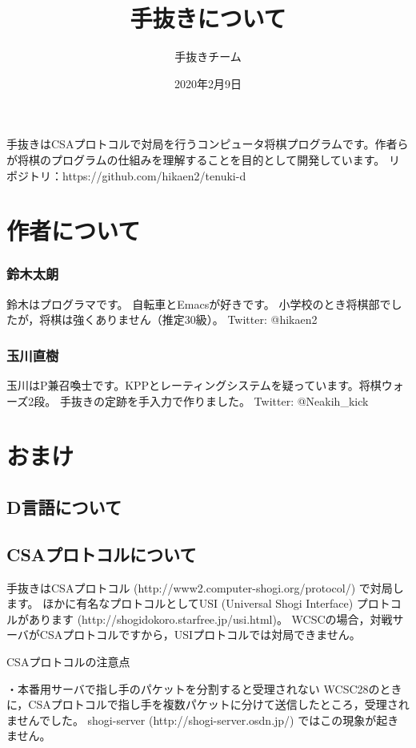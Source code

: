 \documentclass[11pt,a4paper]{ltjsarticle}
\title{手抜きについて}
\author{手抜きチーム}
\date{2020年2月9日}
\begin{document}
\maketitle

手抜きはCSAプロトコルで対局を行うコンピュータ将棋プログラムです。作者らが将棋のプログラムの仕組みを理解することを目的として開発しています。
リポジトリ：https://github.com/hikaen2/tenuki-d



\section{作者について}

\subsubsection*{鈴木太朗}
鈴木はプログラマです。
自転車とEmacsが好きです。
小学校のとき将棋部でしたが，将棋は強くありません（推定30級）。
Twitter: @hikaen2

\subsubsection*{玉川直樹}
玉川はP兼召喚士です。KPPとレーティングシステムを疑っています。将棋ウォーズ2段。
手抜きの定跡を手入力で作りました。
Twitter: @Neakih\_kick



\section{おまけ}

\subsection{D言語について}

\subsection{CSAプロトコルについて}
手抜きはCSAプロトコル (http://www2.computer-shogi.org/protocol/) で対局します。
ほかに有名なプロトコルとしてUSI (Universal Shogi Interface) プロトコルがあります (http://shogidokoro.starfree.jp/usi.html)。
WCSCの場合，対戦サーバがCSAプロトコルですから，USIプロトコルでは対局できません。

CSAプロトコルの注意点

・本番用サーバで指し手のパケットを分割すると受理されない
WCSC28のときに，CSAプロトコルで指し手を複数パケットに分けて送信したところ，受理されませんでした。
shogi-server (http://shogi-server.osdn.jp/) ではこの現象が起きません。
\end{document}
